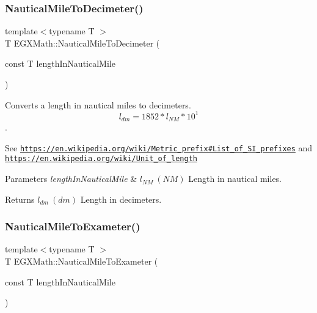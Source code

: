 \subsubsection{\texorpdfstring{Nautical\+Mile\+To\+Decimeter()}{NauticalMileToDecimeter()}}
{\footnotesize\ttfamily template$<$typename T $>$ \\
T E\+G\+X\+Math\+::\+Nautical\+Mile\+To\+Decimeter (\begin{DoxyParamCaption}\item[{const T}]{length\+In\+Nautical\+Mile }\end{DoxyParamCaption})}



Converts a length in nautical miles to decimeters. \[ l_{dm}=1852 * l_{NM} * 10^{1} \]. 

See \href{https://en.wikipedia.org/wiki/Metric_prefix#List_of_SI_prefixes}{\tt https\+://en.\+wikipedia.\+org/wiki/\+Metric\+\_\+prefix\#\+List\+\_\+of\+\_\+\+S\+I\+\_\+prefixes} and \href{https://en.wikipedia.org/wiki/Unit_of_length}{\tt https\+://en.\+wikipedia.\+org/wiki/\+Unit\+\_\+of\+\_\+length} 
\begin{DoxyParams}{Parameters}
{\em length\+In\+Nautical\+Mile} & $ l_{NM}\ (NM)$ Length in nautical miles. \\
\hline
\end{DoxyParams}
\begin{DoxyReturn}{Returns}
$ l_{dm}\ (dm)$ Length in decimeters. 
\end{DoxyReturn}
\mbox{\label{group___e_g_x_math-_conversions-_length_conversions-_nautical-_nautical_mile-_s_i_ga1b24e221d09b49c54d546eb1124e9894}} 
\subsubsection{\texorpdfstring{Nautical\+Mile\+To\+Exameter()}{NauticalMileToExameter()}}
{\footnotesize\ttfamily template$<$typename T $>$ \\
T E\+G\+X\+Math\+::\+Nautical\+Mile\+To\+Exameter (\begin{DoxyParamCaption}\item[{const T}]{length\+In\+Nautical\+Mile }\end{DoxyParamCaption})}



